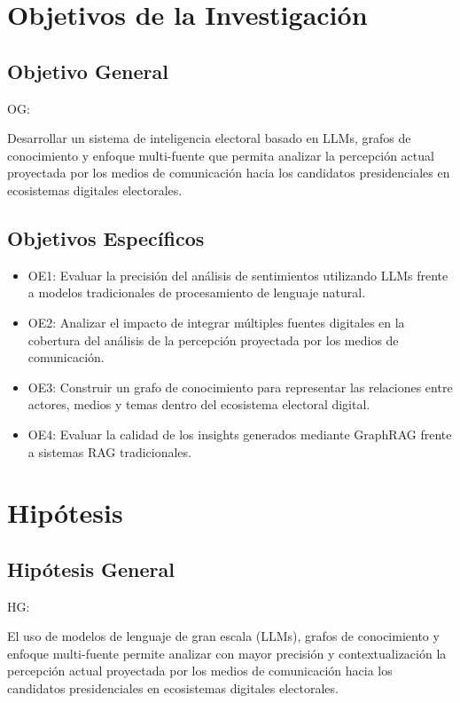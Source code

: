 \section{Objetivos de la Investigación}

\subsection{Objetivo General}
OG: \newcommand{\ObjetivoGeneral}{
Desarrollar un sistema de inteligencia electoral basado en LLMs, grafos de conocimiento y enfoque multi-fuente que permita analizar la percepción actual proyectada por los medios de comunicación hacia los candidatos presidenciales en ecosistemas digitales electorales.
}
\ObjetivoGeneral
\subsection{Objetivos Específicos}

\newcommand{\Objone}{Evaluar la precisión del análisis de sentimientos utilizando LLMs frente a modelos tradicionales de procesamiento de lenguaje natural.}
\newcommand{\Objtwo}{Analizar el impacto de integrar múltiples fuentes digitales en la cobertura del análisis de la percepción proyectada por los medios de comunicación.}
\newcommand{\Objthree}{Construir un grafo de conocimiento para representar las relaciones entre actores, medios y temas dentro del ecosistema electoral digital.}
\newcommand{\Objfour}{Evaluar la calidad de los insights generados mediante GraphRAG frente a sistemas RAG tradicionales.}


\begin{itemize}
	\item OE1: {\Objone}
	\item OE2: {\Objtwo}
	\item OE3: {\Objthree}
	\item OE4: {\Objfour}
\end{itemize}

\section{Hipótesis}

\subsection{Hipótesis General}
HG: \newcommand{\HipotesisGeneral}{
El uso de modelos de lenguaje de gran escala (LLMs), grafos de conocimiento y enfoque multi-fuente permite analizar con mayor precisión y contextualización la percepción actual proyectada por los medios de comunicación hacia los candidatos presidenciales en ecosistemas digitales electorales.
}
\HipotesisGeneral
